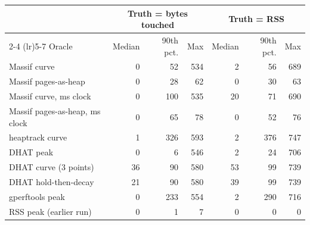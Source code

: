 \begin{tabular}{lrrrrrr}
\toprule
 & \multicolumn{3}{c}{Truth = bytes touched} & \multicolumn{3}{c}{Truth = RSS} \\
\cmidrule(lr){2-4} \cmidrule(lr){5-7}
Oracle & Median & 90th pct. & Max & Median & 90th pct. & Max \\
\midrule
Massif curve & 0 & 52 & 534 & 2 & 56 & 689 \\
Massif pages-as-heap & 0 & 28 & 62 & 0 & 30 & 63 \\
Massif curve, ms clock & 0 & 100 & 535 & 20 & 71 & 690 \\
Massif pages-as-heap, ms clock & 0 & 65 & 78 & 0 & 52 & 76 \\
heaptrack curve & 1 & 326 & 593 & 2 & 376 & 747 \\
DHAT peak & 0 & 6 & 546 & 2 & 24 & 706 \\
DHAT curve (3 points) & 36 & 90 & 580 & 53 & 99 & 739 \\
DHAT hold-then-decay & 21 & 90 & 580 & 39 & 99 & 739 \\
gperftools peak & 0 & 233 & 554 & 2 & 290 & 716 \\
RSS peak (earlier run) & 0 & 1 & 7 & 0 & 0 & 0 \\
\bottomrule
\end{tabular}
